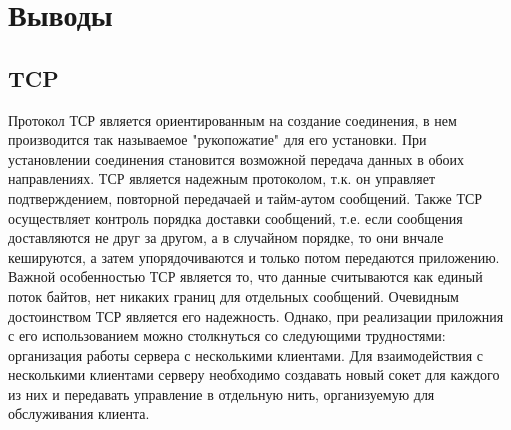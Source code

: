 \documentclass[12pt,a4paper]{report}
\begin{document}
\chapter{Выводы}
\section{TCP}
Протокол ТСР является ориентированным на создание соединения, в нем производится так называемое "рукопожатие" для его установки. При установлении соединения становится возможной передача данных в обоих направлениях.
\linebreak
ТСР является надежным протоколом, т.к. он управляет подтверждением, повторной передачаей и тайм-аутом сообщений. Также ТСР осуществляет контроль порядка доставки сообщений, т.е. если сообщения доставляются не друг за другом, а в случайном порядке, то они внчале кешируются, а затем упорядочиваются и только потом передаются приложению.
Важной особенностью ТСР является то, что данные считываются как единый поток байтов, нет никаких границ для отдельных сообщений.
Очевидным достоинством ТСР является его надежность. Однако, при реализации приложния с его использованием можно столкнуться со следующими трудностями: организация работы сервера с несколькими клиентами. Для взаимодействия с несколькими клиентами серверу необходимо создавать новый сокет для каждого из них и передавать управление в отдельную нить, организуемую для обслуживания клиента.
\end{document}
